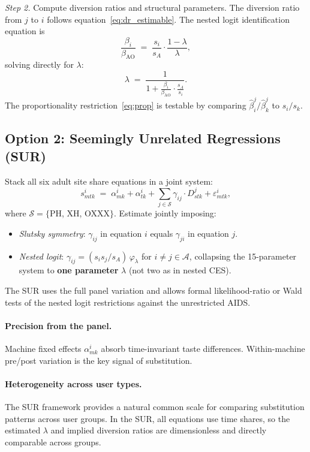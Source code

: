 \documentclass{article}
\begin{document}
\emph{Step 2.} Compute diversion ratios and structural parameters.
The diversion ratio from $j$ to $i$ follows equation~\eqref{eq:dr_estimable}.
The nested logit identification equation is
\begin{equation}\label{eq:ident}
  \frac{\beta_i}{\beta_{\mathrm{AO}}}
  \;=\; \frac{s_i}{s_A} \cdot \frac{1-\lambda}{\lambda},
\end{equation}
solving directly for $\lambda$:
\begin{equation}\label{eq:lambda}
  \lambda \;=\; \frac{1}{1 + \displaystyle\frac{\beta_i}{\beta_{\mathrm{AO}}}
    \cdot \frac{s_A}{s_i}}.
\end{equation}
The proportionality restriction~\eqref{eq:prop} is
testable by comparing $\hat\beta_i^j/\hat\beta_k^j$ to $s_i/s_k$.

\subsection{Option 2: Seemingly Unrelated Regressions (SUR)}

Stack all six adult site share equations in a joint system:
\begin{equation}\label{eq:sur}
  s_{mtk}^i \;=\; \alpha_{mk}^{i} + \alpha_{tk}^{i}
  + \sum_{j \in \mathcal{S}} \gamma_{ij} \cdot D_{stk}^j
  + \varepsilon_{mtk}^{i},
\end{equation}
where $\mathcal{S} = \{$PH, XH, OXXX$\}$.  Estimate jointly imposing:
\begin{itemize}
  \item \emph{Slutsky symmetry}: $\gamma_{ij}$ in equation $i$ equals
    $\gamma_{ji}$ in equation $j$.
  \item \emph{Nested logit}: $\gamma_{ij} = (s_i s_j/s_A)\,\varphi_\lambda$
    for $i \neq j \in \mathcal{A}$, collapsing the 15-parameter system to
    \textbf{one parameter} $\lambda$ (not two as in nested CES).
\end{itemize}
The SUR uses the full panel variation and allows formal likelihood-ratio or
Wald tests of the nested logit restrictions against the unrestricted AIDS.

\paragraph{Precision from the panel.}  Machine fixed effects $\alpha_{mk}^{i}$
absorb time-invariant taste differences.  Within-machine pre/post
variation is the key signal of substitution.

\paragraph{Heterogeneity across user types.}  The SUR framework provides a
natural common scale for comparing substitution patterns across user groups.
In the SUR, all equations use time shares, so the estimated $\lambda$ and
implied diversion ratios are dimensionless and directly comparable across groups.
\end{document}
